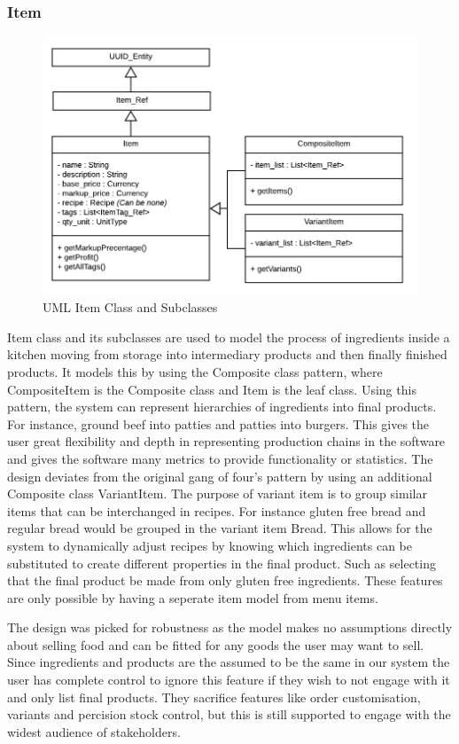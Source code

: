 \subsubsection{Item}
	\begin{figure}
		\centering
		\includegraphics[width=.6\linewidth]{images/data_model/item.png}
		\caption{UML Item Class and Subclasses}
	\end{figure}

	Item class and its subclasses are used to model the process of ingredients inside a kitchen moving from storage into intermediary products and then finally finished products. It models this by using the Composite class pattern, where CompositeItem is the Composite class and Item is the leaf class. Using this pattern, the system can represent hierarchies of ingredients into final products. For instance, ground beef into patties and patties into burgers. This gives the user great flexibility and depth in representing production chains in the software and gives the software many metrics to provide functionality or statistics. The design deviates from the original gang of four's pattern by using an additional Composite class VariantItem. The purpose of variant item is to group similar items that can be interchanged in recipes. For instance gluten free bread and regular bread would be grouped in the variant item Bread. This allows for the system to dynamically adjust recipes by knowing which ingredients can be substituted to create different properties in the final product. Such as selecting that the final product be made from only gluten free ingredients. These features are only possible by having a seperate item model from menu items.
	
	The design was picked for robustness as the model makes no assumptions directly about selling food and can be fitted for any goods the user may want to sell. Since ingredients and products are the assumed to be the same in our system the user has complete control to ignore this feature if they wish to not engage with it and only list final products. They sacrifice features like order customisation, variants and percision stock control, but this is still supported to engage with the widest audience of stakeholders.
	
